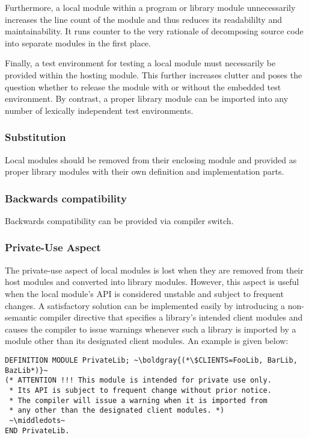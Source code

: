 \documentclass[10pt,a4paper]{article}
\newcommand\boldgray[1]{\textcolor{gray}{\textbf{#1}}}
\newcommand\middledots{\textperiodcentered\textperiodcentered\textperiodcentered}
\begin{document}
Furthermore, a local module within a program or library module unnecessarily
increases the line count of the module and thus reduces its readabililty and
maintainability. It runs counter to the very rationale of decomposing source
code into separate modules in the first place.

Finally, a test environment for testing a local module must necessarily be
provided within the hosting module.  This further increases clutter and poses
the question whether to release the module with or without the embedded test
environment. By contrast, a proper library module can be imported into any
number of lexically independent test environments.

\subsubsection{Substitution}
Local modules should be removed from their enclosing module and provided as
proper library modules with their own definition and implementation parts.

\subsubsection{Backwards compatibility}

Backwards compatibility can be provided via compiler switch.

\subsubsection{Private-Use Aspect}

The private-use aspect of local modules is lost when they are removed from
their host modules and converted into library modules. However, this aspect
is useful when the local module's API is considered unstable and subject to
frequent changes. A satisfactory solution can be implemented easily by
introducing a \gls{non-semantic compiler directive} that specifies a
library's intended client modules and causes the compiler to issue warnings
whenever such a library is imported by a module other than its designated
client modules. An example is given below:

\lstset{style=modula2}
\begin{lstlisting}[escapechar=~]
DEFINITION MODULE PrivateLib; ~\boldgray{(*\$CLIENTS=FooLib, BarLib, BazLib*)}~
(* ATTENTION !!! This module is intended for private use only.
 * Its API is subject to frequent change without prior notice.
 * The compiler will issue a warning when it is imported from
 * any other than the designated client modules. *)
 ~\middledots~
END PrivateLib.
\end{lstlisting}
\end{document}
